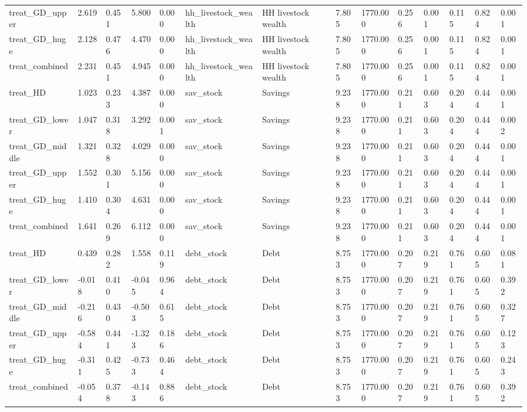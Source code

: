 \begin{tabular}{llllllllllllll}
treat\_GD\_upper & 2.619 & 0.451 & 5.800 & 0.000 & hh\_livestock\_wealth & HH livestock wealth & 7.805 & 1770.000 & 0.256 & 0.001 & 0.115 & 0.824 & 0.001 \\
treat\_GD\_huge & 2.128 & 0.476 & 4.470 & 0.000 & hh\_livestock\_wealth & HH livestock wealth & 7.805 & 1770.000 & 0.256 & 0.001 & 0.115 & 0.824 & 0.001 \\
treat\_combined & 2.231 & 0.451 & 4.945 & 0.000 & hh\_livestock\_wealth & HH livestock wealth & 7.805 & 1770.000 & 0.256 & 0.001 & 0.115 & 0.824 & 0.001 \\
treat\_HD & 1.023 & 0.233 & 4.387 & 0.000 & sav\_stock & Savings & 9.238 & 1770.000 & 0.211 & 0.603 & 0.204 & 0.444 & 0.001 \\
treat\_GD\_lower & 1.047 & 0.318 & 3.292 & 0.001 & sav\_stock & Savings & 9.238 & 1770.000 & 0.211 & 0.603 & 0.204 & 0.444 & 0.002 \\
treat\_GD\_middle & 1.321 & 0.328 & 4.029 & 0.000 & sav\_stock & Savings & 9.238 & 1770.000 & 0.211 & 0.603 & 0.204 & 0.444 & 0.001 \\
treat\_GD\_upper & 1.552 & 0.301 & 5.156 & 0.000 & sav\_stock & Savings & 9.238 & 1770.000 & 0.211 & 0.603 & 0.204 & 0.444 & 0.001 \\
treat\_GD\_huge & 1.410 & 0.304 & 4.631 & 0.000 & sav\_stock & Savings & 9.238 & 1770.000 & 0.211 & 0.603 & 0.204 & 0.444 & 0.001 \\
treat\_combined & 1.641 & 0.269 & 6.112 & 0.000 & sav\_stock & Savings & 9.238 & 1770.000 & 0.211 & 0.603 & 0.204 & 0.444 & 0.001 \\
treat\_HD & 0.439 & 0.282 & 1.558 & 0.119 & debt\_stock & Debt & 8.753 & 1770.000 & 0.207 & 0.219 & 0.761 & 0.605 & 0.081 \\
treat\_GD\_lower & -0.018 & 0.410 & -0.045 & 0.964 & debt\_stock & Debt & 8.753 & 1770.000 & 0.207 & 0.219 & 0.761 & 0.605 & 0.392 \\
treat\_GD\_middle & -0.216 & 0.430 & -0.503 & 0.615 & debt\_stock & Debt & 8.753 & 1770.000 & 0.207 & 0.219 & 0.761 & 0.605 & 0.327 \\
treat\_GD\_upper & -0.584 & 0.441 & -1.323 & 0.186 & debt\_stock & Debt & 8.753 & 1770.000 & 0.207 & 0.219 & 0.761 & 0.605 & 0.123 \\
treat\_GD\_huge & -0.311 & 0.425 & -0.733 & 0.464 & debt\_stock & Debt & 8.753 & 1770.000 & 0.207 & 0.219 & 0.761 & 0.605 & 0.243 \\
treat\_combined & -0.054 & 0.378 & -0.143 & 0.886 & debt\_stock & Debt & 8.753 & 1770.000 & 0.207 & 0.219 & 0.761 & 0.605 & 0.392 \\

\end{tabular}
